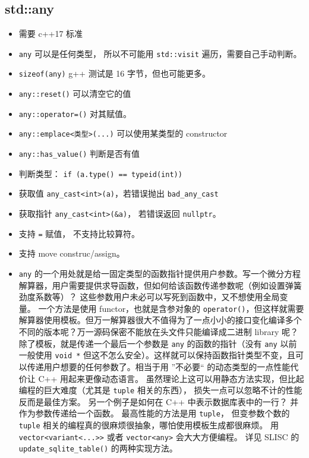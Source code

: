 \subsection{std::any}
\begin{itemize}
\item 需要 c++17 标准
\end{itemize}
\begin{itemize}
\item \verb|any| 可以是任何类型， 所以不可能用 \verb|std::visit| 遍历，需要自己手动判断。
\item \verb|sizeof(any)| g++ 测试是 16 字节，但也可能更多。
\item \verb|any::reset()| 可以清空它的值
\item \verb|any::operator=()| 对其赋值。
\item \verb|any::emplace<类型>(...)| 可以使用某类型的 constructor
\item \verb|any::has_value()| 判断是否有值
\item 判断类型： \verb|if (a.type() == typeid(int))|
\item 获取值 \verb|any_cast<int>(a)|，若错误抛出 \verb|bad_any_cast|
\item 获取指针 \verb|any_cast<int>(&a)|， 若错误返回 \verb|nullptr|。
\item 支持 \verb|=| 赋值， 不支持比较算符。
\item 支持 move construc/assign。
\item \verb|any| 的一个用处就是给一固定类型的函数指针提供用户参数。写一个微分方程解算器，用户需要提供求导函数，但如何给该函数传递参数呢（例如设置弹簧劲度系数等）？ 这些参数用户未必可以写死到函数中，又不想使用全局变量。 一个方法是使用 functor，也就是含参对象的 \verb|operator()|，但这样就需要解算器使用模板。但万一解算器很大不值得为了一点小小的接口变化编译多个不同的版本呢？万一源码保密不能放在头文件只能编译成二进制 library 呢？ 除了模板，就是传递一个最后一个参数是 \verb|any| 的函数的指针（没有 \verb|any| 以前一般使用 \verb|void *| 但这不怎么安全）。这样就可以保持函数指针类型不变，且可以传递用户想要的任何参数了。相当于用 ”不必要“ 的动态类型的一点性能代价让 C++ 用起来更像动态语言。 虽然理论上这可以用静态方法实现，但比起编程的巨大难度（尤其是 \verb|tuple| 相关的东西）， 损失一点可以忽略不计的性能反而是最佳方案。 另一个例子是如何在 C++ 中表示数据库表中的一行？ 并作为参数传递给一个函数。 最高性能的方法是用 \verb|tuple|， 但变参数个数的 \verb|tuple| 相关的编程真的很麻烦很抽象，哪怕使用模板生成都很麻烦。 用 \verb|vector<variant<...>>| 或者 \verb|vector<any>| 会大大方便编程。 详见 SLISC 的 \verb|update_sqlite_table()| 的两种实现方法。
\end{itemize}

